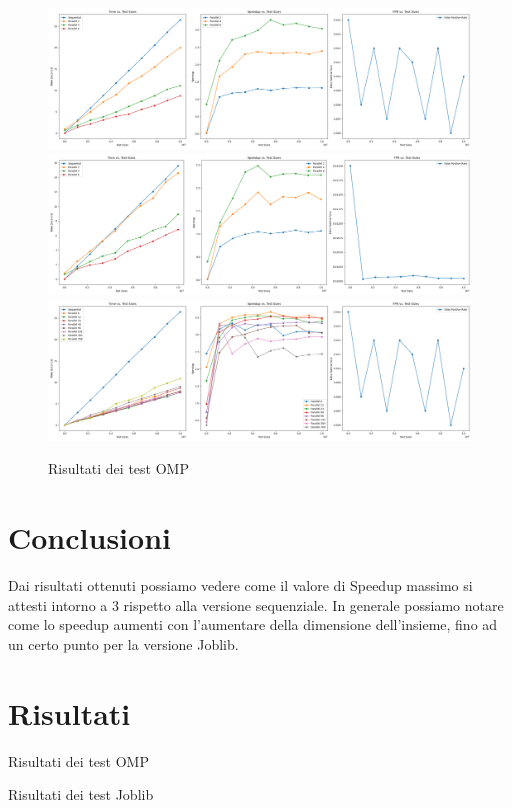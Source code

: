 \documentclass[11pt]{article}
\begin{document}
    \begin{figure}
        \includegraphics[width=\textwidth]{plot_setup}
        \includegraphics[width=\textwidth]{plot_filter}
        \includegraphics[width=\textwidth]{plot_chunks}
        \caption{Risultati dei test OMP}\label{fig:omp-result}
    \end{figure}

    \section{Conclusioni}\label{sec:conclusioni}
    Dai risultati ottenuti possiamo vedere come il valore di Speedup massimo si attesti intorno a 3 rispetto alla versione sequenziale.
    In generale possiamo notare come lo speedup aumenti con l'aumentare della dimensione dell'insieme, fino ad un certo punto per la versione Joblib.

    \section{Risultati}\label{sec:risultati}
    \begin{table}
        \caption{Risultati dei test OMP}\label{tab:omp-result-csv}
    \end{table}

    \begin{table}
        \caption{Risultati dei test Joblib}\label{tab:joblib-result-csv}
    \end{table}
\end{document}
